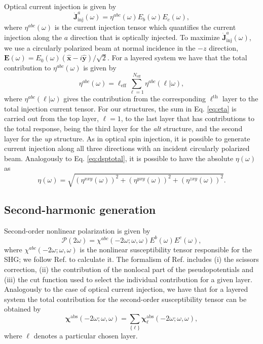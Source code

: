 \documentclass[pss]{wiley2sp} %
\begin{document}
Optical current injection is given \cite{arzatePRB14} by
\begin{equation*}
\mathbf{\dot{J}}^{a}_{\text{inj}}(\omega) =
\eta^{abc}(\omega)E_{b}(\omega)E_{c}(\omega), \label{eq:current}
\end{equation*}
where $\eta^{abc}(\omega)$ is the current injection tensor which quantifies
the current injection along the $a$ direction that is optically injected. To
maximize $\mathbf{\dot{J}}^{a}_{\text{inj}}(\omega)$, we use a circularly
polarized beam at normal incidence in the $-z$  direction, $\mathbf{E}(\omega)
= E_{0}(\omega)(\mathbf{\hat{x}} - i\mathbf{\hat{y}})/\sqrt{2}$. For a layered
system we have that the total contribution to $
\eta^{abc}(\omega)$ is given \cite{arzatePRB14} by
\begin{equation}\label{eq:eta}
\eta^{abc}(\omega)=
\ell_{\mathrm{eff}}\sum_{\ell=1}^{N_{\mathrm{eff}}}\eta^{abc}(\ell|\omega),
\end{equation}
where $\eta^{abc}(\ell|\omega)$ gives the contribution from the corresponding
$\ell^{\mathrm{th}}$ layer to the total injection current tensor. For our structures,
the sum in Eq. \eqref{eq:eta} is carried out from the top layer, $\ell=1$, to
the last layer that has contributions to the total response, being the third layer
for the \emph{alt} structure, and the second layer for the \emph{up}
structure. 
As in
optical spin injection, it is possible to generate current injection along all
three directions with an incident circularly polarized beam. Analogously to Eq.
\eqref{eq:dsptotal}, it is possible to have the absolute $\eta(\omega)$
\cite{arzatePRB14} as
\begin{equation}\label{eq:etatotal}
\eta(\omega) =
\sqrt{(\eta^{xxy}(\omega))^{2} +
      (\eta^{yxy}(\omega))^{2} +
      (\eta^{zxy}(\omega))^{2}
      }.
\end{equation}


\subsection{Second-harmonic generation}\label{sec:theory-SHG}
Second-order nonlinear polarization is given by \cite{andersonPRB15} 
\begin{equation*}\label{eq:pol}
\mathcal{P}(2\omega) = 
\chi^{abc}(-2\omega;\omega,\omega)E^{b}(\omega)E^{c}(\omega),
\end{equation*} 
where $\chi^{abc}(-2\omega;\omega,\omega)$ is the nonlinear
susceptibility tensor responsible for the SHG; we follow Ref.
\cite{andersonPRB15} to calculate it. The 
formalism of Ref. \cite{andersonPRB15} includes (i) the scissors correction,
(ii) the contribution of the nonlocal part of the pseudopotentials and (iii)
the cut function used to select the individual contribution for a given layer.
Analogously to the case of optical current injection, we have that for a layered
system the total contribution for the second-order susceptibility tensor can be
obtained by
\begin{equation}
\boldsymbol{\chi}^{\mathrm{abs}}(-2\omega;\omega,\omega) = 
\sum_{\{\ell\}} \boldsymbol{\chi}^{\mathrm{abs}}_{\ell}(-2\omega;\omega,\omega),
\end{equation}
where $\ell$ denotes a particular chosen layer.
\end{document}
